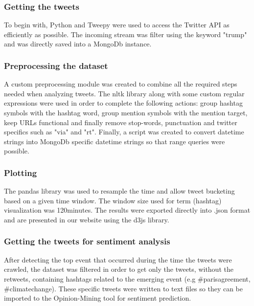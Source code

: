\documentclass[12pt,svgnames]{report}
\begin{document}
\subsubsection*{Getting the tweets}
To begin with, Python and Tweepy \cite{tweepy} were used to access the Twitter API as efficiently as possible. The incoming stream was filter using the keyword "trump" and was directly saved into a MongoDb instance.

\subsubsection*{Preprocessing the dataset}
A custom preprocessing module was created to combine all the required steps needed when analyzing tweets. The nltk \cite{nltk} library along with some custom regular expressions were used in order to complete the following actions: group hashtag symbols with the hashtag word, group mention symbols with the mention target, keep URLs functional and finally remove stop-words, punctuation and twitter specifics such as "via" and "rt". Finally, a script was created to convert datetime strings into MongoDb specific datetime strings so that range queries were possible.

\subsubsection*{Plotting}
The pandas \cite{pandas} library was used to resample the time and allow tweet bucketing based on a given time window. The window size used for term (hashtag) visualization was 120minutes. The results were exported directly into .json format and are presented in our website \cite{projectwebsite} using the d3js \cite{d3js} library.

\subsubsection*{Getting the tweets for sentiment analysis}
After detecting the top event that occurred during the time the tweets were crawled, the dataset was filtered in order to get only the tweets, without the retweets, containing hashtags related to the emerging event (e.g \#parisagreement, \#climatechange). These specific tweets were written to text files so they can be imported to the Opinion-Mining tool\cite{opinion} for sentiment prediction.
\end{document}
